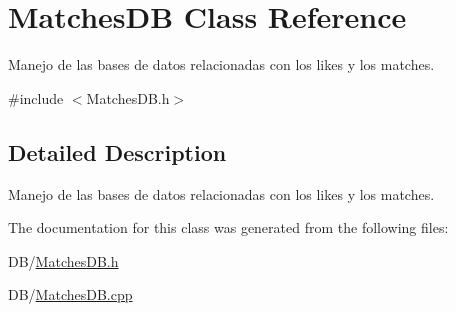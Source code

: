 \hypertarget{class_matches_d_b}{}\section{Matches\+D\+B Class Reference}
\label{class_matches_d_b}


Manejo de las bases de datos relacionadas con los likes y los matches.  




{\ttfamily \#include $<$Matches\+D\+B.\+h$>$}



\subsection{Detailed Description}
Manejo de las bases de datos relacionadas con los likes y los matches. 

The documentation for this class was generated from the following files\+:\begin{DoxyCompactItemize}
\item 
D\+B/\hyperlink{_matches_d_b_8h}{Matches\+D\+B.\+h}\item 
D\+B/\hyperlink{_matches_d_b_8cpp}{Matches\+D\+B.\+cpp}\end{DoxyCompactItemize}
